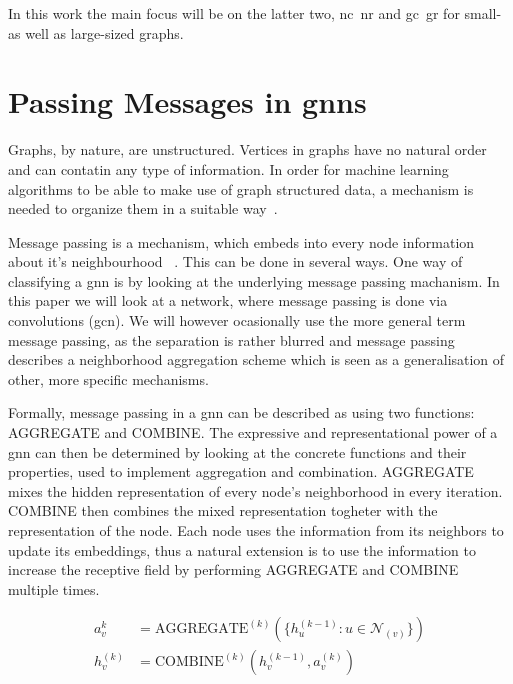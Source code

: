 In this work the main focus will be on the latter two, \ac{nc}\ \ac{nr} and \ac{gc}\
\ac{gr} for small- as well as large-sized graphs.

\section{Passing Messages in \Acsp*{gnn}}
\label{sec:related:message}

Graphs, by nature, are unstructured. Vertices in graphs have no natural order and can
contatin any type of information. In order for machine learning algorithms to be able
to make use of graph structured data, a mechanism is needed to organize them in a
suitable way~\cite{Zhou2020a,Hamilton2017a,Zhang19}.


Message passing is a mechanism, which embeds into every node information about it's neighbourhood ~\cite{Xu2019,Zhou2020a}. This can be done in several ways. One way of classifying a \ac{gnn} is by looking at the underlying message passing machanism. In this paper we will look at a network, where message passing is done via convolutions (\acf{gcn}). We will however ocasionally use the more general term message passing, as the separation is rather blurred and message passing describes a neighborhood aggregation scheme which is seen as a generalisation of other, more specific mechanisms.

Formally, message passing in a \ac{gnn} can be described as using two functions:
AGGREGATE and COMBINE. The expressive and representational power of a \ac{gnn} can
then be determined by looking at the concrete functions and their properties, used to implement
aggregation and combination. AGGREGATE mixes the hidden representation of every node's neighborhood in every iteration. COMBINE then combines the mixed representation togheter with the representation of the node. Each node uses the information from its neighbors to update its embeddings, thus a natural extension is to use the information to increase the receptive field by performing AGGREGATE and COMBINE multiple times.

\begin{align*}
    a_{v}^{k}   & = \mathrm{AGGREGATE}^{(k)}(\{h_{u}^{(k-1)}: u \in \mathcal{N}_{(v)}\}) \\
    h_{v}^{(k)} & = \mathrm{COMBINE}^{(k)}(h_{v}^{(k-1)}, a_{v}^{(k)})
\end{align*}

